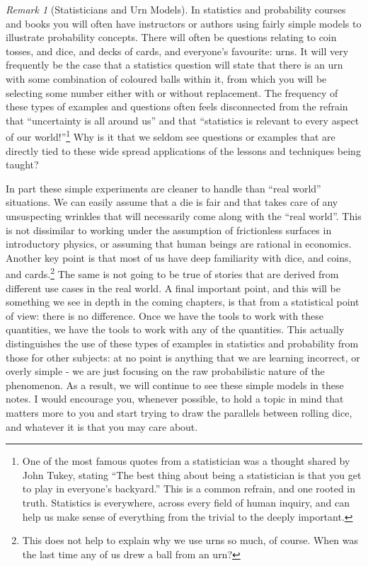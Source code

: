 \documentclass[
  letterpaper,
  DIV=11,
  numbers=noendperiod]{scrreprt}
\theoremstyle{definition}
\theoremstyle{definition}
\theoremstyle{definition}
\theoremstyle{remark}
\newtheorem*{remark}{Remark}
\begin{document}
\begin{remark}[Statisticians and Urn Models]
In statistics and probability courses and books you will often have
instructors or authors using fairly simple models to illustrate
probability concepts. There will often be questions relating to coin
tosses, and dice, and decks of cards, and everyone's favourite: urns. It
will very frequently be the case that a statistics question will state
that there is an urn with some combination of coloured balls within it,
from which you will be selecting some number either with or without
replacement. The frequency of these types of examples and questions
often feels disconnected from the refrain that ``uncertainty is all
around us'' and that ``statistics is relevant to every aspect of our
world!''\footnote{One of the most famous quotes from a statistician was
  a thought shared by John Tukey, stating ``The best thing about being a
  statistician is that you get to play in everyone's backyard.'' This is
  a common refrain, and one rooted in truth. Statistics is everywhere,
  across every field of human inquiry, and can help us make sense of
  everything from the trivial to the deeply important.} Why is it that
we seldom see questions or examples that are directly tied to these wide
spread applications of the lessons and techniques being taught?

In part these simple experiments are cleaner to handle than ``real
world'' situations. We can easily assume that a die is fair and that
takes care of any unsuspecting wrinkles that will necessarily come along
with the ``real world''. This is not dissimilar to working under the
assumption of frictionless surfaces in introductory physics, or assuming
that human beings are rational in economics. Another key point is that
most of us have deep familiarity with dice, and coins, and
cards.\footnote{This does not help to explain why we use urns so much,
  of course. When was the last time any of us drew a ball from an urn?}
The same is not going to be true of stories that are derived from
different use cases in the real world. A final important point, and this
will be something we see in depth in the coming chapters, is that from a
statistical point of view: there is no difference. Once we have the
tools to work with these quantities, we have the tools to work with any
of the quantities. This actually distinguishes the use of these types of
examples in statistics and probability from those for other subjects: at
no point is anything that we are learning incorrect, or overly simple -
we are just focusing on the raw probabilistic nature of the phenomenon.
As a result, we will continue to see these simple models in these notes.
I would encourage you, whenever possible, to hold a topic in mind that
matters more to you and start trying to draw the parallels between
rolling dice, and whatever it is that you may care about.


\end{remark}
\end{document}
